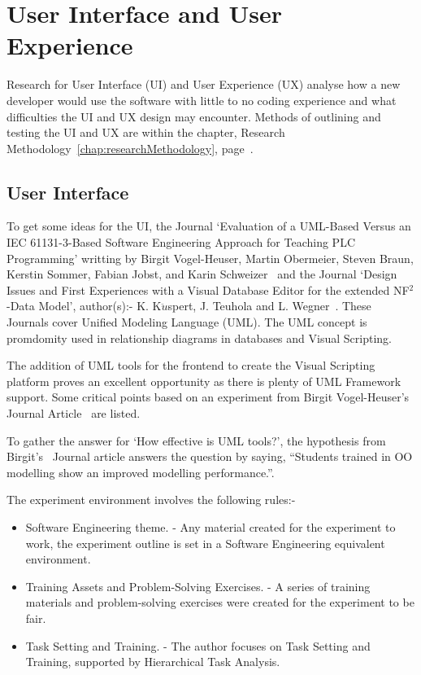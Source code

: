 \documentclass[12pt]{report} %
\begin{document}
	\section{User Interface and User Experience}
	\label{subsec:userInterfaceUserExperience}
        Research for User Interface (UI) and User Experience (UX) analyse how a new developer would use the software with little to no coding experience and what difficulties the UI and UX design may encounter. Methods of outlining and testing the UI and UX are within the chapter, Research Methodology~\ref{chap:researchMethodology}, page~\pageref{chap:researchMethodology}.

		\subsection{User Interface}
		\label{subsec:userInterface}
			To get some ideas for the UI, the Journal `Evaluation of a UML-Based Versus an IEC 61131-3-Based Software Engineering Approach for Teaching PLC Programming' writting by Birgit Vogel-Heuser, Martin Obermeier, Steven Braun, Kerstin Sommer, Fabian Jobst, and Karin Schweizer~\cite{vogel-heuser_evaluation_2013} and the Journal `Design Issues and First Experiences with a Visual Database Editor for the extended NF$^{2}$-Data Model', author(s):- K. K${\ddot{u}}$spert, J. Teuhola and L. Wegner~\cite{kuspert_design_1990}. These Journals cover Unified Modeling Language (UML). The UML concept is promdomity used in relationship diagrams in databases and Visual Scripting. 

			The addition of UML tools for the frontend to create the Visual Scripting platform proves an excellent opportunity as there is plenty of UML Framework support. Some critical points based on an experiment from Birgit Vogel-Heuser's Journal Article~\cite{vogel-heuser_evaluation_2013} are listed.

			To gather the answer for `How effective is UML tools?', the hypothesis from Birgit's~\cite{vogel-heuser_evaluation_2013} Journal article answers the question by saying, ``Students trained in OO modelling show an improved modelling performance.''. 
		
			The experiment environment involves the following rules:-
			\begin{itemize}
			\item Software Engineering theme. - Any material created for the experiment to work, the experiment outline is set in a Software Engineering equivalent environment.
			\item Training Assets and Problem-Solving Exercises. - A series of training materials and problem-solving exercises were created for the experiment to be fair.
			\item Task Setting and Training. - The author focuses on Task Setting and Training, supported by Hierarchical Task Analysis.
			\end{itemize}
\end{document}
